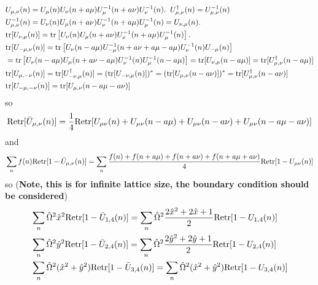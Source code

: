\begin{equation}
\begin{split}
&U_{\mu, \nu}(n)= U_{\mu}(n)U_{\nu}(n+a\mu)U^{-1}_{\mu}(n+a\nu)U^{-1}_{\nu}(n).\;\;U^{\dagger}_{\mu, \nu}(n)=U^{-1}_{\mu, \nu}(n)\\
&U^{-1}_{\mu, \nu}(n)=U_{\nu}(n)U_{\mu}(n+a\nu)U^{-1}_{\nu}(n+a\mu)U^{-1}_{\mu}(n)=U_{\nu, \mu}(n).\\
&{\rm tr}[U_{\nu, \mu}(n)]= {\rm tr}\left[U_{\nu}(n)U_{\mu}(n+a\nu)U^{-1}_{\nu}(n+a\mu)U^{-1}_{\mu}(n)\right].\\
&{\rm tr}[U_{-\mu, \nu}(n)]= {\rm tr}\left[U_{\nu}(n-a\mu)U^{-1}_{-\mu}(n+a\nu+a\mu-a\mu)U^{-1}_{\nu}(n)U_{-\mu}(n)\right]\\
&={\rm tr}\left[U_{\nu}(n-a\mu)U_{\mu}(n+a\nu-a\mu)U^{-1}_{\nu}(n)U^{-1}_{\mu}(n-a\mu)\right]={\rm tr}[U_{\nu, \mu}(n-a\mu)]={\rm tr}[U^{\dagger}_{\mu, \nu}(n-a\mu)]\\
&{\rm tr}[U_{\mu, -\nu}(n)]={\rm tr}[U^{\dagger}_{-\nu, \mu}(n)]=({\rm tr}[U_{-\nu, \mu}(n)])^*=({\rm tr}[U_{\mu, \nu}(n-a\nu)])^*={\rm tr}[U^{\dagger}_{\mu, \nu}(n-a\nu)]\\
&{\rm tr}[U_{-\mu, -\nu}(n)]={\rm tr}[U_{\mu, \nu}(n-a\mu-a\nu)]
\end{split}
\end{equation}
so
\begin{equation}
\begin{split}
&{\rm Retr}[\bar{U}_{\mu, \nu}(n)]=\frac{1}{4}{\rm Retr}[U_{\mu\nu}(n)+U_{\mu\nu}(n-a\mu)+U_{\mu\nu}(n-a\nu)+U_{\mu\nu}(n-a\mu-a\nu)]\\
\end{split}
\end{equation}
and
\begin{equation}
\begin{split}
&\sum _n f(n){\rm Retr}[1-\bar{U}_{\mu, \nu}(n)]=\sum _n\frac{f(n)+f(n+a\mu)+f(n+a\nu)+f(n+a\mu+a\nu)}{4}{\rm Retr}[1-U_{\mu\nu}(n)]\\
\end{split}
\end{equation}
so (\textbf{Note, this is for infinite lattice size, the boundary condition should be considered})
\begin{equation}
\begin{split}
&\sum _n \hat{\Omega}^2\hat{x}^2{\rm Retr}[1-\bar{U}_{1, 4}(n)]=\sum _n\hat{\Omega}^2\frac{2\hat{x}^2+2\hat{x}+1}{2}{\rm Retr}[1-U_{1,4}(n)]\\
&\sum _n \hat{\Omega}^2\hat{y}^2{\rm Retr}[1-\bar{U}_{2, 4}(n)]=\sum _n\hat{\Omega}^2\frac{2\hat{y}^2+2\hat{y}+1}{2}{\rm Retr}[1-U_{2,4}(n)]\\
&\sum _n \hat{\Omega}^2(\hat{x}^2+\hat{y}^2){\rm Retr}[1-\bar{U}_{3, 4}(n)]=\sum _n\hat{\Omega}^2(\hat{x}^2+\hat{y}^2){\rm Retr}[1-U_{3,4}(n)]\\
\end{split}
\end{equation}
